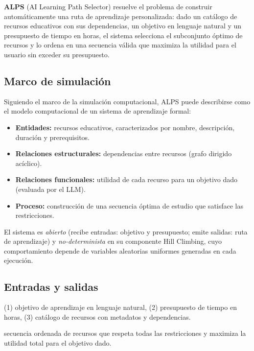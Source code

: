 \documentclass[11pt, a4paper]{article}
\begin{document}
\begin{ideabox}
\textbf{ALPS} (AI Learning Path Selector) resuelve el problema de construir automáticamente una ruta de aprendizaje personalizada: dado un catálogo de recursos educativos con sus dependencias, un objetivo en lenguaje natural y un presupuesto de tiempo en horas, el sistema selecciona el subconjunto óptimo de recursos y lo ordena en una secuencia válida que maximiza la utilidad para el usuario sin exceder su presupuesto.
\end{ideabox}

\subsection{Marco de simulación}

Siguiendo el marco de la simulación computacional, ALPS puede describirse como el modelo computacional de un sistema de aprendizaje formal:

\begin{itemize}[leftmargin=1.5em]
  \item \textbf{Entidades:} recursos educativos, caracterizados por nombre, descripción, duración y prerequisitos.
  \item \textbf{Relaciones estructurales:} dependencias entre recursos (grafo dirigido acíclico).
  \item \textbf{Relaciones funcionales:} utilidad de cada recurso para un objetivo dado (evaluada por el LLM).
  \item \textbf{Proceso:} construcción de una secuencia óptima de estudio que satisface las restricciones.
\end{itemize}

El sistema es \emph{abierto} (recibe entradas: objetivo y presupuesto; emite salidas: ruta de aprendizaje) y \emph{no-determinista} en su componente Hill Climbing, cuyo comportamiento depende de variables aleatorias uniformes generadas en cada ejecución.

\subsection{Entradas y salidas}

\begin{description}[leftmargin=1.5em, style=nextline]
  \item[Entradas] (1) objetivo de aprendizaje en lenguaje natural, (2) presupuesto de tiempo en horas, (3) catálogo de recursos con metadatos y dependencias.
  \item[Salida] secuencia ordenada de recursos que respeta todas las restricciones y maximiza la utilidad total para el objetivo dado.
\end{description}
\end{document}
